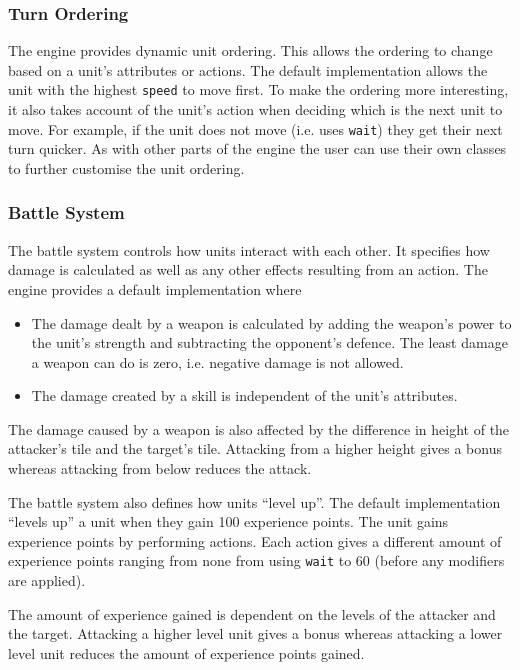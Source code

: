 \subsubsection{Turn Ordering}
The engine provides dynamic unit ordering.  This allows the ordering to change based on a unit's attributes or actions.  The default implementation allows the unit with the highest \texttt{speed} to move first.  To make the ordering more interesting, it also takes account of the unit's action when deciding which is the next unit to move. For example, if the unit does not move (i.e. uses \texttt{wait}) they get their next turn quicker. As with other parts of the engine the user can use their own classes to further customise the unit ordering.

\subsubsection{Battle System}
\label{ssub:battle_system}

The battle system controls how units interact with each other.  It specifies how damage is calculated as well as any other effects resulting from an action. The engine provides a default implementation where 
\begin{itemize}
	\item The damage dealt by a weapon is calculated by adding the weapon's power to the unit's strength and subtracting the opponent's defence. The least damage a weapon can do is zero, i.e. negative damage is not allowed.
	\item The damage created by a skill is independent of the unit's attributes.
\end{itemize}

The damage caused by a weapon is also affected by the difference in height of the attacker's tile and the target's tile. Attacking from a higher height gives a bonus whereas attacking from below reduces the attack.


The battle system also defines how units ``level up''. The default implementation ``levels up'' a unit when they gain 100 experience points. The unit gains experience points by performing actions. Each action gives a different amount of experience points ranging from none from using \texttt{wait} to 60 (before any modifiers are applied).

The amount of experience gained is dependent on the levels of the attacker and the target. Attacking a higher level unit gives a bonus whereas attacking a lower level unit reduces the amount of experience points gained.

